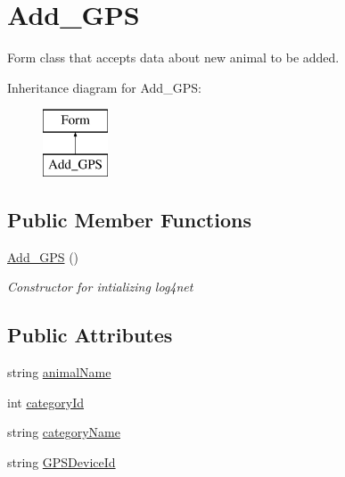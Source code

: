 \hypertarget{classWildlifeTrackingApp_1_1Add__GPS}{}\section{Add\+\_\+\+G\+PS}
\label{classWildlifeTrackingApp_1_1Add__GPS}


Form class that accepts data about new animal to be added.  


Inheritance diagram for Add\+\_\+\+G\+PS\+:\begin{figure}[H]
\begin{center}
\leavevmode
\includegraphics[height=2.000000cm]{classWildlifeTrackingApp_1_1Add__GPS}
\end{center}
\end{figure}
\subsection*{Public Member Functions}
\begin{DoxyCompactItemize}
\item 
\hyperlink{classWildlifeTrackingApp_1_1Add__GPS_a6133da1c133f9c77c5e7c7d0c68b59af}{Add\+\_\+\+G\+PS} ()
\begin{DoxyCompactList}\small\item\em Constructor for intializing log4net \end{DoxyCompactList}\end{DoxyCompactItemize}
\subsection*{Public Attributes}
\begin{DoxyCompactItemize}
\item 
string \hyperlink{classWildlifeTrackingApp_1_1Add__GPS_afd38ba6641283469fc9e94212467f9a2}{animal\+Name}
\item 
int \hyperlink{classWildlifeTrackingApp_1_1Add__GPS_a423f91c56dc35040d661cfbe357f7c78}{category\+Id}
\item 
string \hyperlink{classWildlifeTrackingApp_1_1Add__GPS_a1eca787c85e1bc45b49bbd281d4106fd}{category\+Name}
\item 
string \hyperlink{classWildlifeTrackingApp_1_1Add__GPS_aa73a9566135b30b8c5d94dde36ab0e32}{G\+P\+S\+Device\+Id}
\end{DoxyCompactItemize}
